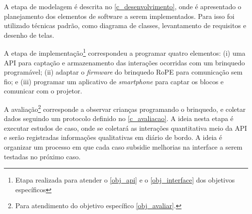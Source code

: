 A etapa de modelagem é descrita no \autoref{c_desenvolvimento}, onde é apresentado o planejamento dos elementos de software a serem implementados. Para isso foi utilizado técnicas padrão, como diagrama de classes, levantamento de requisitos e desenho de telas.

A etapa de implementação\footnote{Etapa realizada para atender o \autoref{obj_api} e o \autoref{obj_interface} dos objetivos específicos} correspondeu a programar quatro elementos: (i) uma \ac{API} para captação e armazenamento das interações ocorridas com um brinquedo programável; (ii) adaptar o \textit{firmware} do brinquedo RoPE para comunicação sem fio; e (iii) programar um aplicativo de \textit{smartphone} para captar os blocos e comunicar com o projetor.

A avaliação\footnote{ Para atendimento do objetivo específico \autoref{obj_avaliar}.} corresponde a observar crianças programando o brinquedo, e coletar dados seguindo um protocolo definido no \autoref{c_avaliacao}. A ideia nesta etapa é executar estudos de caso, onde se coletará as interações quantitativa meio da \ac{API} e serão registradas informações qualitativas em diário de bordo. A ideia é organizar um processo em que cada caso subsidie melhorias na interface a serem testadas no próximo caso.

